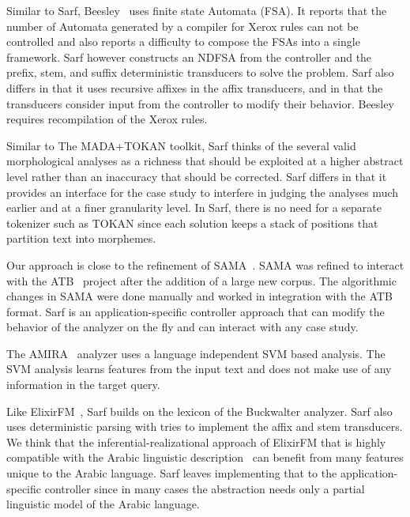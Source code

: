\documentclass[11pt]{article}
\begin{document}
Similar to Sarf, Beesley~ uses
finite state Automata (FSA). 
It reports that the number of Automata generated by a compiler
for Xerox rules can not be controlled and also reports a difficulty 
to compose the FSAs into a single framework. 
Sarf however constructs an NDFSA from
the controller and the prefix, stem, and suffix deterministic 
transducers to solve the problem.
Sarf also differs in that it uses recursive affixes in the 
affix transducers, and in that the transducers consider
input from the controller to modify their behavior. 
Beesley requires recompilation of the Xerox rules. %

Similar to The MADA+TOKAN toolkit, Sarf thinks of
the several valid morphological analyses as a richness that 
should be exploited at a higher abstract level rather than
an inaccuracy that should be corrected. 
Sarf differs in that it provides an interface for the 
case study to interfere in judging the analyses much earlier and
at a finer granularity level. 
In Sarf, there is no need for a separate tokenizer such as
TOKAN since each solution keeps a stack of positions
that partition text into morphemes.


Our approach is close to the refinement of SAMA~\cite{Maamouri:10}.
SAMA was refined to interact with
the ATB~\cite{Maamouri:04} project after the addition of a large 
new corpus. 
The algorithmic changes in SAMA were
done manually and worked in integration with the ATB format. 
Sarf is an application-specific controller approach that can modify 
the behavior of the analyzer on the fly and can interact
with any case study. 

The AMIRA~\cite{Diab:07} analyzer uses 
a language independent SVM based analysis. 
The SVM analysis learns features from the input text 
and does not make use of any information 
in the target query.

Like ElixirFM~\cite{Otakar:07}, Sarf builds on the lexicon
of the Buckwalter analyzer. 
Sarf also uses deterministic parsing with tries 
to implement the affix and stem transducers. 
We think that the inferential-realizational approach 
of ElixirFM
that is highly compatible with the Arabic linguistic 
description~\cite{Badawi:04}
can benefit from many features unique to the Arabic language.
Sarf leaves implementing that to the application-specific controller
since in many cases the abstraction needs only a partial 
linguistic model of the Arabic language. 
\end{document}

